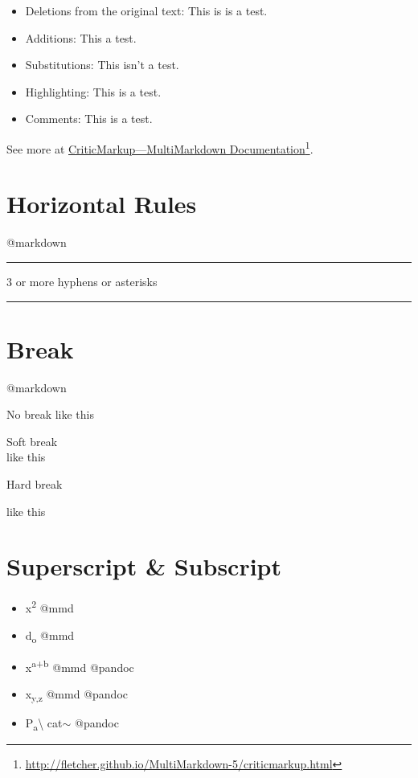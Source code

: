 \begin{itemize}
\item Deletions from the original text: This is is a test.

\item Additions: This a test.

\item Substitutions: This isn't a test.

\item Highlighting: This is a test.

\item Comments: This is a test.

\end{itemize}

See more at \href{http://fletcher.github.io/MultiMarkdown-5/criticmarkup.html}{CriticMarkup---MultiMarkdown Documentation}\footnote{\href{http://fletcher.github.io/MultiMarkdown-5/criticmarkup.html}{http:/\slash fletcher.github.io\slash MultiMarkdown-5\slash criticmarkup.html}}.

\section{Horizontal Rules}
\label{horizontalrules}

@markdown

\begin{center}\rule{3in}{0.4pt}\end{center}


3 or more hyphens or asterisks

\begin{center}\rule{3in}{0.4pt}\end{center}


\section{Break}
\label{break}

@markdown

No break
like this

Soft break\\
like this

Hard break

like this

\section{Superscript \& Subscript}
\label{superscriptsubscript}

\begin{itemize}
\item x\textsuperscript{2} @mmd

\item d\textsubscript{o} @mmd

\item x\textsuperscript{a+b} @mmd @pandoc

\item x\textsubscript{y,z} @mmd @pandoc

\item P\textsubscript{a}\textbackslash{} cat\ensuremath{\sim} @pandoc

\end{itemize}

